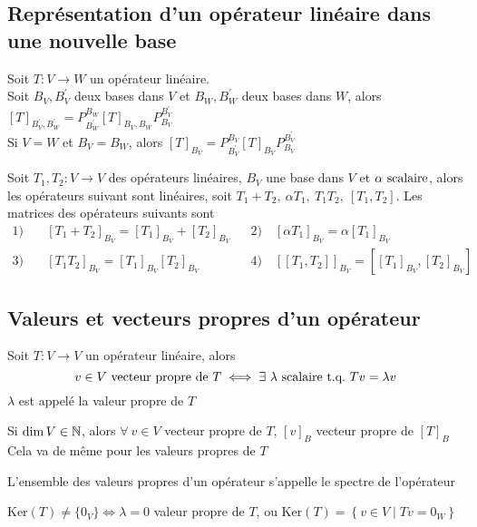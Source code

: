 \subsection{Représentation d'un opérateur linéaire dans une nouvelle base}
\begin{theorem}
    Soit $T\colon V \to W$ un opérateur linéaire. \\
    Soit $B_V, B_V^\prime$ deux bases dans $V$ et $B_W, B_W^\prime$ deux bases dans $W$, alors
    $[T]_{B_V^\prime, B_W^\prime} = P_{B_W^\prime}^{B_W} [T]_{B_V, B_W} P^{B_V^\prime}_{B_V}$ \\
    Si $V = W$ et $B_V = B_W$, alors $[T]_{B_V} = P_{B_V^\prime}^{B_V} [T]_{B_V} P^{B_V^\prime}_{B_V}$
\end{theorem}
\begin{theorem}
    Soit $T_1, T_2 \colon V \to V$ des opérateurs linéaires, $B_V$ une base dans $V$ et $\alpha \text{ scalaire}$, alors 
    les opérateurs suivant sont linéaires, soit $T_1 + T_2, \ \alpha T_1, \ T_1T_2, \ [T_1, T_2]$.
    Les matrices des opérateurs suivants sont 
    \begin{align*}
        1) \quad &[T_1 + T_2]_{B_V} = [T_1]_{B_V} + [T_2]_{B_V}& &2) \quad [\alpha T_1]_{B_V} = \alpha [T_1]_{B_V} \\
        3) \quad &[T_1T_2]_{B_V} = [T_1]_{B_V}[T_2]_{B_V}& &4) \quad \left[[T_1, T_2]\right]_{B_V} = \left[[T_1]_{B_V}, [T_2]_{B_V}\right]
    \end{align*}
\end{theorem}

\subsection{Valeurs et vecteurs propres d'un opérateur}
\begin{definition}
    Soit $T\colon V \to V$ un opérateur linéaire, alors 
    \[v \in V \ \text{vecteur propre de} \ T \iff \exists \ \scalaire{\lambda} \ \text{t.q.} \ Tv = \lambda v\]
    $\lambda$ est appelé la valeur propre de $T$
\end{definition}
\begin{theorem}
    Si $\dim V \in \mathbb{N}$, alors $\forall \ v \in V$ vecteur propre de $T$, $[v]_B$ vecteur propre de $[T]_B$ \\
    Cela va de même pour les valeurs propres de $T$
\end{theorem}
\begin{definition}
    L'ensemble des valeurs propres d'un opérateur s'appelle le spectre de l'opérateur
\end{definition}
\begin{theorem}
   $\text{Ker}(T) \neq \{0_V\} \iff \lambda = 0$ valeur propre de $T$, ou $\text{Ker}(T) = \left\{ v \in V \mid Tv = 0_W \right\}$
\end{theorem}